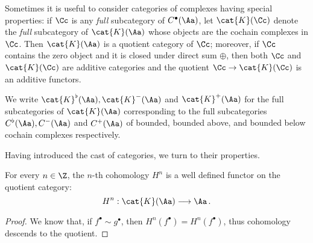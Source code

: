 Sometimes it is useful to consider 
categories of complexes having special properties: 
if $\Cc$ is any \emph{full} subcategory of $C^{\bullet}(\Aa)$, 
let $\cat{K}(\Cc)$ denote the \emph{full} subcategory of $\cat{K}(\Aa)$
whose objects are the cochain complexes in $\Cc$. 
Then $\cat{K}(\Aa)$ is a quotient category of $\Cc$;
moreover, if $\Cc$ contains the zero object and it is closed
under direct sum $\oplus$, then both 
$\Cc$ and $\cat{K}(\Cc)$ are additive categories
and the quotient $\Cc \to \cat{K}(\Cc)$ is an additive functors.

\begin{df}
    We write $\cat{K}^{\flat}(\Aa), \cat{K}^{-}(\Aa)$ and $\cat{K}^{+}(\Aa)$ 
    for the full subcategories of $\cat{K}(\Aa)$ 
    corresponding to the full subcategories 
    $C^{\flat}(\Aa), C^{-}(\Aa)$ and $C^{+}(\Aa)$ 
    of bounded, bounded above, 
    and bounded below cochain complexes respectively.
\end{df}

Having introduced the cast of categories, we turn to their properties.

\begin{lemma}
    For every $n \in \Z$, the $n$-th cohomology $H^{n}$
    is a well defined functor on the quotient category:
    \begin{equation*}
        H^{n} : \cat{K}(\Aa) \longrightarrow \Aa\,.
    \end{equation*}
    \begin{proof}
        We know that, if $f^{\bullet} \sim g^{\bullet}$,
        then $H^{n}(f^{\bullet}) = H^{n}(f^{\bullet})$,
        thus cohomology descends to the quotient.
    \end{proof}
\end{lemma}

